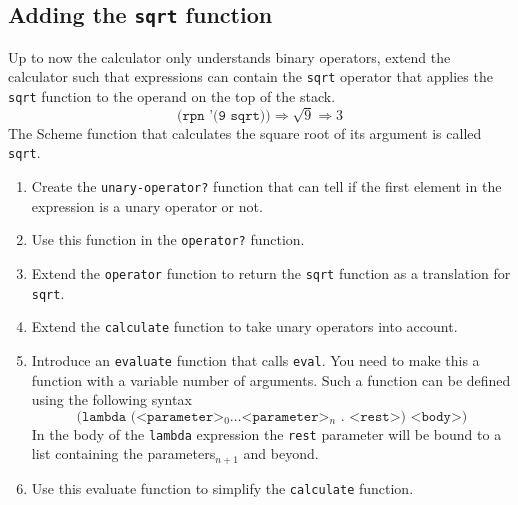 \documentclass[12pt,a4paper,english,twoside]{article}
\begin{document}
\subsection{Adding the \texttt{sqrt} function}
Up to now the calculator only understands binary operators, extend the 
calculator such that expressions can contain the \texttt{sqrt} operator that 
applies the \texttt{sqrt} function to the operand on the top of the stack.  
\begin{equation*}
  \texttt{(rpn '(9 sqrt))} \Rightarrow \sqrt{9} \Rightarrow 3
\end{equation*}
The Scheme function that calculates the square root of its argument is called 
\texttt{sqrt}.
\begin{enumerate}
  \item Create the \texttt{unary-operator?} function that can tell if the 
    first element in the expression is a unary operator or not. 
  \item Use this function in the \texttt{operator?} function.
  \item Extend the \texttt{operator} function to return the \texttt{sqrt} 
    function as a translation for \texttt{sqrt}.
  \item Extend the \texttt{calculate} function to take unary operators into 
    account.
  \item Introduce an \texttt{evaluate} function that calls \texttt{eval}. You 
    need to make this a function with a variable number of arguments. Such a 
    function can be defined using the following syntax
    \begin{equation*}
      \texttt{(lambda (<parameter>$_{0} \dots $<parameter>$_{n}$ . <rest>) <body>)}
    \end{equation*}
    In the body of the \texttt{lambda} expression the \texttt{rest} parameter 
    will be bound to a list containing the parameters$_{n+1}$ and beyond.
  \item Use this evaluate function to simplify the \texttt{calculate} 
    function.
\end{enumerate}
\end{document}
